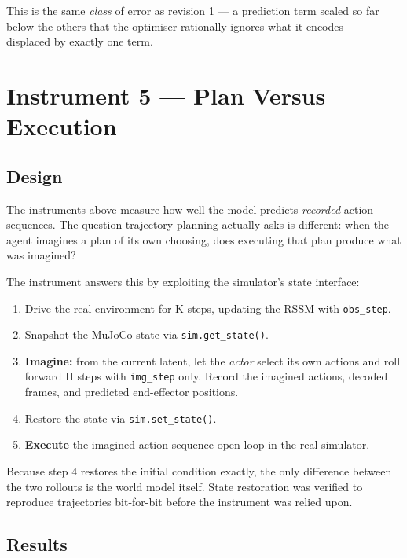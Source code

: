 \documentclass[12pt,a4paper,oneside]{report}
\providecommand{\tightlist}{%
  \setlength{\itemsep}{0pt}\setlength{\parskip}{0pt}}
\begin{document}
This is the same \emph{class} of error as revision 1 --- a prediction term scaled so far
below the others that the optimiser rationally ignores what it encodes ---
displaced by exactly one term.

\hypertarget{instrument-5-plan-versus-execution}{%
\section{Instrument 5 --- Plan Versus Execution}\label{instrument-5-plan-versus-execution}}

\hypertarget{design-1}{%
\subsection{Design}\label{design-1}}

The instruments above measure how well the model predicts \emph{recorded} action
sequences. The question trajectory planning actually asks is different: when the
agent imagines a plan of its own choosing, does executing that plan produce what
was imagined?

The instrument answers this by exploiting the simulator's state interface:

\begin{enumerate}
\def\labelenumi{\arabic{enumi}.}
\tightlist
\item
  Drive the real environment for K steps, updating the RSSM with \texttt{obs\_step}.
\item
  Snapshot the MuJoCo state via \texttt{sim.get\_state()}.
\item
  \textbf{Imagine:} from the current latent, let the \emph{actor} select its own actions
  and roll forward H steps with \texttt{img\_step} only. Record the imagined actions,
  decoded frames, and predicted end-effector positions.
\item
  Restore the state via \texttt{sim.set\_state()}.
\item
  \textbf{Execute} the imagined action sequence open-loop in the real simulator.
\end{enumerate}

Because step 4 restores the initial condition exactly, the only difference
between the two rollouts is the world model itself. State restoration was
verified to reproduce trajectories bit-for-bit before the instrument was relied
upon.

\hypertarget{results-1}{%
\subsection{Results}\label{results-1}}
\end{document}
